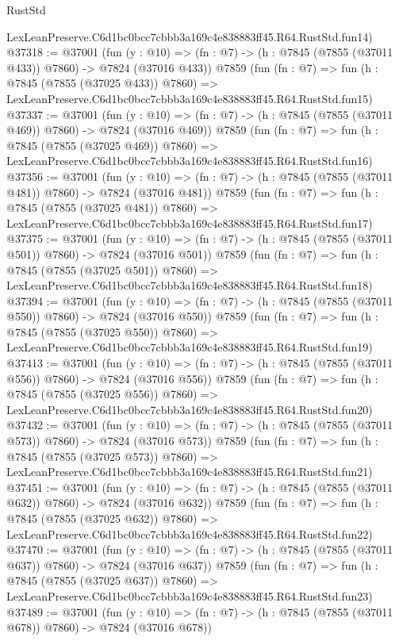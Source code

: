 \begin{lexlean}{RustStd}
\begin{coremodule}
    LexLeanPreserve.C6d1bc0bcc7cbbb3a169c4e838883ff45.R64.RustStd.fun14)
@37318 := @37001
    (fun (y : @10) => (fn : @7) -> (h : @7845 (@7855 (@37011 @433)) @7860) -> @7824 (@37016 @433))
    @7859
    (fun (fn : @7) =>
    fun (h : @7845 (@7855 (@37025 @433)) @7860) =>
    LexLeanPreserve.C6d1bc0bcc7cbbb3a169c4e838883ff45.R64.RustStd.fun15)
@37337 := @37001
    (fun (y : @10) => (fn : @7) -> (h : @7845 (@7855 (@37011 @469)) @7860) -> @7824 (@37016 @469))
    @7859
    (fun (fn : @7) =>
    fun (h : @7845 (@7855 (@37025 @469)) @7860) =>
    LexLeanPreserve.C6d1bc0bcc7cbbb3a169c4e838883ff45.R64.RustStd.fun16)
@37356 := @37001
    (fun (y : @10) => (fn : @7) -> (h : @7845 (@7855 (@37011 @481)) @7860) -> @7824 (@37016 @481))
    @7859
    (fun (fn : @7) =>
    fun (h : @7845 (@7855 (@37025 @481)) @7860) =>
    LexLeanPreserve.C6d1bc0bcc7cbbb3a169c4e838883ff45.R64.RustStd.fun17)
@37375 := @37001
    (fun (y : @10) => (fn : @7) -> (h : @7845 (@7855 (@37011 @501)) @7860) -> @7824 (@37016 @501))
    @7859
    (fun (fn : @7) =>
    fun (h : @7845 (@7855 (@37025 @501)) @7860) =>
    LexLeanPreserve.C6d1bc0bcc7cbbb3a169c4e838883ff45.R64.RustStd.fun18)
@37394 := @37001
    (fun (y : @10) => (fn : @7) -> (h : @7845 (@7855 (@37011 @550)) @7860) -> @7824 (@37016 @550))
    @7859
    (fun (fn : @7) =>
    fun (h : @7845 (@7855 (@37025 @550)) @7860) =>
    LexLeanPreserve.C6d1bc0bcc7cbbb3a169c4e838883ff45.R64.RustStd.fun19)
@37413 := @37001
    (fun (y : @10) => (fn : @7) -> (h : @7845 (@7855 (@37011 @556)) @7860) -> @7824 (@37016 @556))
    @7859
    (fun (fn : @7) =>
    fun (h : @7845 (@7855 (@37025 @556)) @7860) =>
    LexLeanPreserve.C6d1bc0bcc7cbbb3a169c4e838883ff45.R64.RustStd.fun20)
@37432 := @37001
    (fun (y : @10) => (fn : @7) -> (h : @7845 (@7855 (@37011 @573)) @7860) -> @7824 (@37016 @573))
    @7859
    (fun (fn : @7) =>
    fun (h : @7845 (@7855 (@37025 @573)) @7860) =>
    LexLeanPreserve.C6d1bc0bcc7cbbb3a169c4e838883ff45.R64.RustStd.fun21)
@37451 := @37001
    (fun (y : @10) => (fn : @7) -> (h : @7845 (@7855 (@37011 @632)) @7860) -> @7824 (@37016 @632))
    @7859
    (fun (fn : @7) =>
    fun (h : @7845 (@7855 (@37025 @632)) @7860) =>
    LexLeanPreserve.C6d1bc0bcc7cbbb3a169c4e838883ff45.R64.RustStd.fun22)
@37470 := @37001
    (fun (y : @10) => (fn : @7) -> (h : @7845 (@7855 (@37011 @637)) @7860) -> @7824 (@37016 @637))
    @7859
    (fun (fn : @7) =>
    fun (h : @7845 (@7855 (@37025 @637)) @7860) =>
    LexLeanPreserve.C6d1bc0bcc7cbbb3a169c4e838883ff45.R64.RustStd.fun23)
@37489 := @37001
    (fun (y : @10) => (fn : @7) -> (h : @7845 (@7855 (@37011 @678)) @7860) -> @7824 (@37016 @678))

\end{coremodule}
\end{lexlean}

